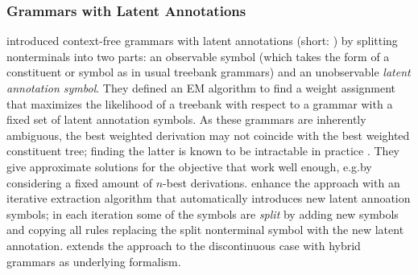 \documentclass[../document.tex]{subfiles}
\begin{document}
    \subsubsection*{Grammars with Latent Annotations}
    \citet{Mat05} introduced context-free grammars with latent annotations (short: ) by splitting nonterminals into two parts: an observable symbol (which takes the form of a constituent or  symbol as in usual treebank grammars) and an unobservable \emph{latent annotation symbol}.
    They defined an EM algorithm to find a weight assignment that maximizes the likelihood of a treebank with respect to a grammar with a fixed set of latent annotation symbols.
    As these grammars are inherently ambiguous, the best weighted derivation may not coincide with the best weighted constituent tree; finding the latter is known to be intractable in practice \citep[they conclude that finding the best weighted constituent tree is \emph{NP-hard} in Section 3]{Mat05}.
    They give approximate solutions for the objective that work well enough, e.g.\@ by considering a fixed amount of \(n\)-best derivations.
    \citet{Petrov06} enhance the approach with an iterative extraction algorithm that automatically introduces new latent annoation symbols; in each iteration some of the symbols are \emph{split} by adding new symbols and copying all rules replacing the split nonterminal symbol with the new latent annotation.
    \citet{Geb20} extends the approach to the discontinuous case with hybrid grammars as underlying formalism.
\end{document}
